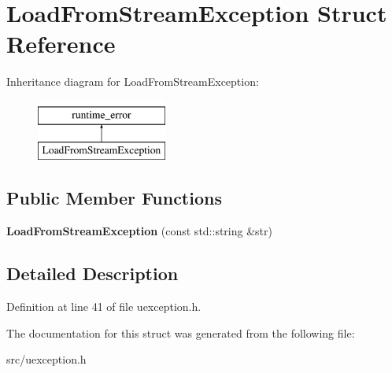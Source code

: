 \hypertarget{struct_load_from_stream_exception}{}\section{Load\+From\+Stream\+Exception Struct Reference}
\label{struct_load_from_stream_exception}
Inheritance diagram for Load\+From\+Stream\+Exception\+:\begin{figure}[H]
\begin{center}
\leavevmode
\includegraphics[height=2.000000cm]{struct_load_from_stream_exception}
\end{center}
\end{figure}
\subsection*{Public Member Functions}
\begin{DoxyCompactItemize}
\item 
\mbox{\label{struct_load_from_stream_exception_a11fdad41add90b9dab8394a6dadfb106}} 
{\bfseries Load\+From\+Stream\+Exception} (const std\+::string \&str)
\end{DoxyCompactItemize}


\subsection{Detailed Description}


Definition at line 41 of file uexception.\+h.



The documentation for this struct was generated from the following file\+:\begin{DoxyCompactItemize}
\item 
src/uexception.\+h\end{DoxyCompactItemize}
